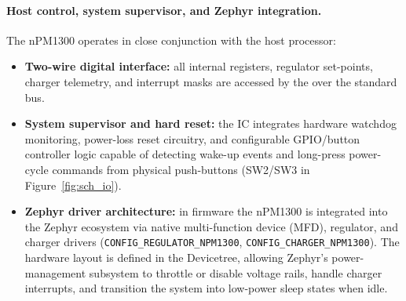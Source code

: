 \documentclass[12pt, a4paper]{article}
\begin{document}
\paragraph{Host control, system supervisor, and Zephyr integration.}
The nPM1300 operates in close conjunction with the host processor:
\begin{itemize}
    \item \textbf{Two-wire digital interface:} all internal registers, regulator set-points, charger telemetry, and interrupt masks are accessed by the  over the standard  bus.
    \item \textbf{System supervisor and hard reset:} the IC integrates hardware watchdog monitoring, power-loss reset circuitry, and configurable GPIO/button controller logic capable of detecting wake-up events and long-press power-cycle commands from physical push-buttons (SW2/SW3 in Figure~\ref{fig:sch_io}).
    \item \textbf{Zephyr driver architecture:} in firmware the nPM1300 is integrated into the Zephyr ecosystem via native multi-function device (MFD), regulator, and charger drivers (\texttt{CONFIG\_REGULATOR\_NPM1300}, \texttt{CONFIG\_CHARGER\_NPM1300}). The hardware layout is defined in the Devicetree, allowing Zephyr's power-management subsystem to throttle or disable voltage rails, handle charger interrupts, and transition the system into low-power sleep states when idle.
\end{itemize}
\end{document}
